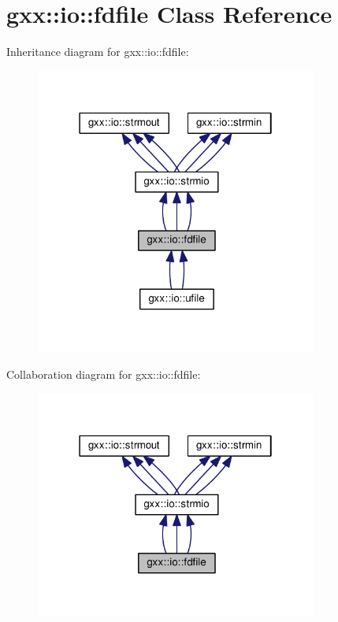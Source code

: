 \hypertarget{classgxx_1_1io_1_1fdfile}{}\section{gxx\+:\+:io\+:\+:fdfile Class Reference}
\label{classgxx_1_1io_1_1fdfile}


Inheritance diagram for gxx\+:\+:io\+:\+:fdfile\+:
\nopagebreak
\begin{figure}[H]
\begin{center}
\leavevmode
\includegraphics[width=262pt]{classgxx_1_1io_1_1fdfile__inherit__graph}
\end{center}
\end{figure}


Collaboration diagram for gxx\+:\+:io\+:\+:fdfile\+:
\nopagebreak
\begin{figure}[H]
\begin{center}
\leavevmode
\includegraphics[width=262pt]{classgxx_1_1io_1_1fdfile__coll__graph}
\end{center}
\end{figure}
